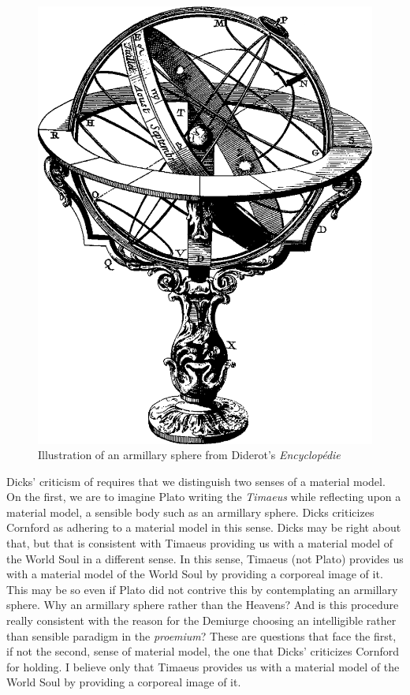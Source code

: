 \begin{figure}[htbp]
     \centering
         \includegraphics[scale=0.20]{graphics/Armillary_sphere.png}
     \caption{Illustration of an armillary sphere from Diderot's \emph{Encyclopédie}}
     \label{fig:2}
\end{figure}

Dicks' \citeyearpar{Dicks:1970aa} criticism of \citet{Cornford:1935fk} requires that we distinguish two senses of a material model. On the first, we are to imagine Plato writing the \emph{Timaeus} while reflecting upon a material model, a sensible body such as an armillary sphere. Dicks criticizes Cornford as adhering to a material model in this sense. Dicks may be right about that, but that is consistent with Timaeus providing us with a material model of the World Soul in a different sense. In this sense, Timaeus (not Plato) provides us with a material model of the World Soul by providing a corporeal image of it. This may be so even if Plato did not contrive this by contemplating an armillary sphere. Why an armillary sphere rather than the Heavens? And is this procedure really consistent with the reason for the Demiurge choosing an intelligible rather than sensible paradigm in the \emph{proemium}? These are questions that face the first, if not the second, sense of material model, the one that Dicks' criticizes Cornford for holding. I believe only that Timaeus provides us with a material model of the World Soul by providing a corporeal image of it. 

